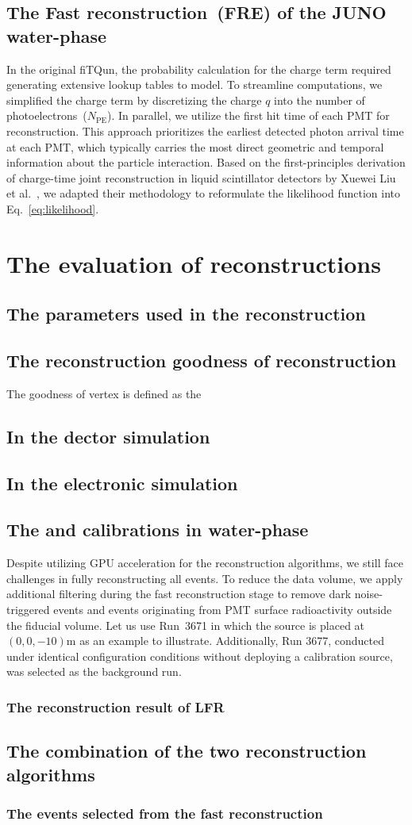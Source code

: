 \subsection{The Fast reconstruction~(FRE) of the JUNO water-phase}
In the original fiTQun, the probability calculation for the charge term required generating extensive lookup tables to model. To streamline computations, we simplified the charge term by discretizing the charge $q$ into the number of photoelectrons~($N_{\mathrm{PE}}$).
In parallel, we utilize the first hit time of each PMT for reconstruction. This approach prioritizes the earliest detected photon arrival time at each PMT, which typically carries the most direct geometric and temporal information about the particle interaction. Based on the first-principles derivation of charge-time joint reconstruction in liquid scintillator detectors by Xuewei Liu et al.~\cite{xuewei}, we adapted their methodology to reformulate the likelihood function into Eq.~\ref{eq:likelihood}.
\section{The evaluation of reconstructions}
\subsection{The parameters used in the reconstruction}
\subsection{The reconstruction goodness of reconstruction}
The goodness of vertex is defined as the
\subsection{In the dector simulation}
\subsection{In the electronic simulation}
\subsection{The  and  calibrations in water-phase}
Despite utilizing GPU acceleration for the reconstruction algorithms, we still face challenges in fully reconstructing all events. To reduce the data volume, we apply additional filtering during the fast reconstruction stage to remove dark noise-triggered events and events originating from PMT surface radioactivity outside the fiducial volume.
Let us use Run~3671 in which the  source is placed at $(0,0,-10)$\si{m} as an example to illustrate. Additionally, Run 3677, conducted under identical configuration conditions without deploying a calibration source, was selected as the background run.
\subsubsection{The reconstruction result of LFR}


\subsection{The combination of the two reconstruction algorithms}
\subsubsection{The events selected from the fast reconstruction}
